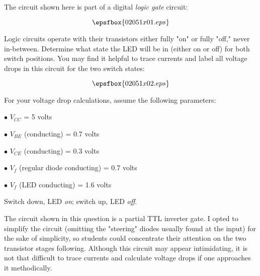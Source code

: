 

The circuit shown here is part of a digital {\it logic gate} circuit:

$$\epsfbox{02051x01.eps}$$

Logic circuits operate with their transistors either fully "on" or fully "off," never in-between.  Determine what state the LED will be in (either on or off) for both switch positions.  You may find it helpful to trace currents and label all voltage drops in this circuit for the two switch states:

$$\epsfbox{02051x02.eps}$$

For your voltage drop calculations, assume the following parameters:

\medskip
\item{$\bullet$} $V_{CC}$ = 5 volts
\item{$\bullet$} $V_{BE}$ (conducting) = 0.7 volts
\item{$\bullet$} $V_{CE}$ (conducting) = 0.3 volts
\item{$\bullet$} $V_{f}$ (regular diode conducting) = 0.7 volts
\item{$\bullet$} $V_{f}$ (LED conducting) = 1.6 volts
\medskip







Switch down, LED {\it on}; switch up, LED {\it off}.







The circuit shown in this question is a partial TTL inverter gate.  I opted to simplify the circuit (omitting the "steering" diodes usually found at the input) for the sake of simplicity, so students could concentrate their attention on the two transistor stages following.  Although this circuit may appear intimidating, it is not that difficult to trace currents and calculate voltage drops if one approaches it methodically.




